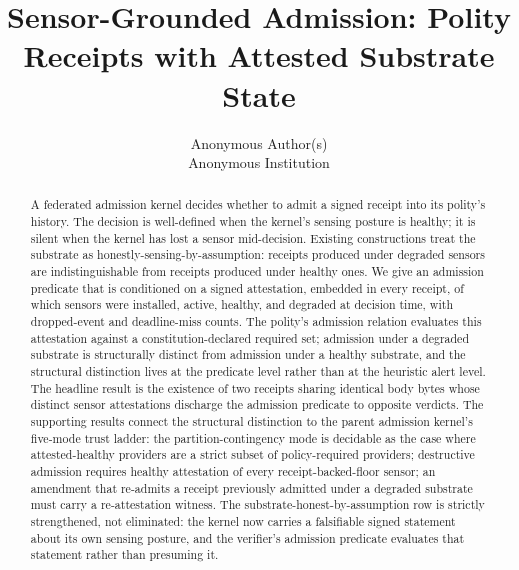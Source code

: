 \documentclass[letterpaper,twocolumn,10pt]{article}
\date{}
\title{\Large \bf Sensor-Grounded Admission: Polity Receipts with Attested Substrate State}
\author{
{\rm Anonymous Author(s)}\\
Anonymous Institution
}
\begin{document}
\maketitle

\begin{abstract}
A federated admission kernel decides whether to admit a signed receipt into its polity's history. The decision is well-defined when the kernel's sensing posture is healthy; it is silent when the kernel has lost a sensor mid-decision. Existing constructions treat the substrate as honestly-sensing-by-assumption: receipts produced under degraded sensors are indistinguishable from receipts produced under healthy ones. We give an admission predicate that is conditioned on a signed attestation, embedded in every receipt, of which sensors were installed, active, healthy, and degraded at decision time, with dropped-event and deadline-miss counts. The polity's admission relation evaluates this attestation against a constitution-declared required set; admission under a degraded substrate is structurally distinct from admission under a healthy substrate, and the structural distinction lives at the predicate level rather than at the heuristic alert level. The headline result is the existence of two receipts sharing identical body bytes whose distinct sensor attestations discharge the admission predicate to opposite verdicts. The supporting results connect the structural distinction to the parent admission kernel's five-mode trust ladder: the partition-contingency mode is decidable as the case where attested-healthy providers are a strict subset of policy-required providers; destructive admission requires healthy attestation of every receipt-backed-floor sensor; an amendment that re-admits a receipt previously admitted under a degraded substrate must carry a re-attestation witness. The substrate-honest-by-assumption row is strictly strengthened, not eliminated: the kernel now carries a falsifiable signed statement about its own sensing posture, and the verifier's admission predicate evaluates that statement rather than presuming it.
\end{abstract}












\appendix





\end{document}
